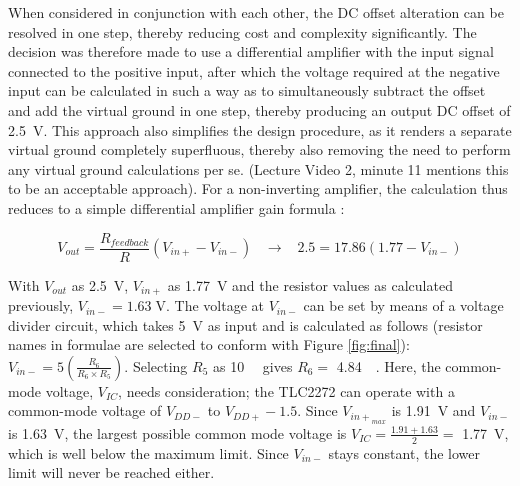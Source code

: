 When considered in conjunction with each other, the DC offset alteration can be resolved in one step, thereby reducing cost and complexity significantly. The decision was therefore made to use a differential amplifier with the input signal connected to the positive input, after which the voltage required at the negative input can be calculated in such a way as to simultaneously subtract the offset and add the virtual ground in one step, thereby producing an output DC offset of \SI{2.5}{\volt}.  This approach also simplifies the design procedure, as it renders a separate virtual ground completely superfluous, thereby also removing the need to perform any virtual ground calculations per se.  (Lecture Video 2, minute 11\cite{vground} mentions this to be an acceptable approach). For a non-inverting amplifier, the calculation thus reduces to a simple differential amplifier gain formula \cite{opamp}: 

$$V_{out}=\frac{{R}_{feedback}}{{R}}\left({V}_{in+}-{V}_{in-}\right) \;\;\; \rightarrow \;\;\; 2.5=17.86\left(1.77-{V}_{in-}\right)$$

With $V_{out}$ as \SI{2.5}{\volt}, $V_{in+}$ as \SI{1.77}{\volt} and the resistor values as calculated previously, ${V}_{in-} = 1.63 \; \mathrm{V}$. The voltage at ${V}_{in-}$ can be set by means of a voltage divider circuit, which takes \SI{5}{\volt} as input and is calculated as follows (resistor names in formulae are selected to conform with Figure \ref{fig:final}): ${V}_{in-} = 5 (\frac{R_{6}}{R_{6}\times R_{5}})$. Selecting $R_5$ as \SI{10}{\kilo \Omega} gives $R_6 =$ \SI{4.84}{\kilo \Omega}. Here, the common-mode voltage, $V_{IC}$, needs consideration; the TLC2272 can operate with a common-mode voltage of $V_{DD-}$ to $V_{DD+} - 1.5$\cite{tlc2272}. Since $V_{{in+}_{max}}$ is \SI{1.91}{\volt} and $V_{in-}$ is \SI{1.63}{\volt}, the largest possible common mode voltage is $V_{IC} = \frac{1.91 + 1.63}{2} =$ \SI{1.77}{\volt}, which is well below the maximum limit. Since $V_{in-}$ stays constant, the lower limit will never be reached either.\\

